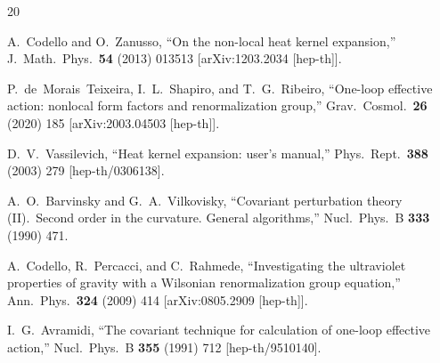 \documentclass[12pt,a4paper]{article}
\theoremstyle{definition}
\theoremstyle{remark}
\begin{document}
\begin{thebibliography}{20}

A.~Codello and O.~Zanusso,
``On the non-local heat kernel expansion,''
J.\ Math.\ Phys.\ \textbf{54} (2013) 013513
[arXiv:1203.2034 [hep-th]].

P.~de~Morais~Teixeira, I.~L.~Shapiro, and T.~G.~Ribeiro,
``One-loop effective action: nonlocal form factors and
renormalization group,''
Grav.\ Cosmol.\ \textbf{26} (2020) 185
[arXiv:2003.04503 [hep-th]].

D.~V.~Vassilevich,
``Heat kernel expansion: user's manual,''
Phys.\ Rept.\ \textbf{388} (2003) 279
[hep-th/0306138].

A.~O.~Barvinsky and G.~A.~Vilkovisky,
``Covariant perturbation theory (II).\ Second order in the curvature.
General algorithms,''
Nucl.\ Phys.\ B \textbf{333} (1990) 471.

A.~Codello, R.~Percacci, and C.~Rahmede,
``Investigating the ultraviolet properties of gravity with a
Wilsonian renormalization group equation,''
Ann.\ Phys.\ \textbf{324} (2009) 414
[arXiv:0805.2909 [hep-th]].

I.~G.~Avramidi,
``The covariant technique for calculation of one-loop effective
action,''
Nucl.\ Phys.\ B \textbf{355} (1991) 712
[hep-th/9510140].

\end{thebibliography}
\end{document}
